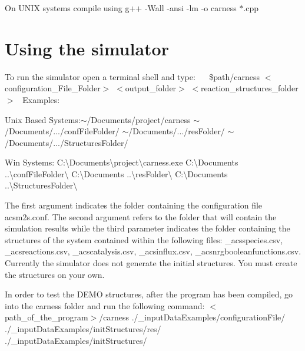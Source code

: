 On U\+N\+I\+X systems compile using {\ttfamily g++} -\/\+Wall -\/ansi -\/lm -\/o carness $\ast$.cpp ~\newline
~\newline
 \hypertarget{a00002_secUsage}{}\section{Using the simulator}\label{a00002_secUsage}
To run the simulator open a terminal shell and type\+:~\newline
~\newline
 {\ttfamily } \$path/carness {\ttfamily } $<$configuration\+\_\+\+File\+\_\+\+Folder$>$ {\ttfamily } $<$output\+\_\+folder$>$ {\ttfamily } $<$reaction\+\_\+structures\+\_\+folder$>$~\newline
 Examples\+:
\begin{DoxyItemize}
\item Unix Based Systems\+:{\ttfamily $\sim$/\+Documents/project/carness} {\ttfamily $\sim$/\+Documents/}.../conf\+File\+Folder/ {\ttfamily $\sim$/\+Documents/}.../res\+Folder/ {\ttfamily $\sim$/\+Documents/}.../\+Structures\+Folder/
\item Win Systems\+: {\ttfamily C\+:\textbackslash{}Documents\textbackslash{}project\textbackslash{}carness.\+exe} {\ttfamily C\+:\textbackslash{}Documents} ..\textbackslash{}conf\+File\+Folder\textbackslash{} {\ttfamily C\+:\textbackslash{}Documents} ..\textbackslash{}res\+Folder\textbackslash{} {\ttfamily C\+:\textbackslash{}Documents} ..\textbackslash{}Structures\+Folder\textbackslash{}
\end{DoxyItemize}

The first argument indicates the folder containing the configuration file acsm2s.\+conf. The second argument refers to the folder that will contain the simulation results while the third parameter indicates the folder containing the structures of the system contained within the following files\+: \+\_\+acsspecies.\+csv, \+\_\+acsreactions.\+csv, \+\_\+acscatalysis.\+csv, \+\_\+acsinflux.\+csv, \+\_\+acsnrgbooleanfunctions.\+csv. Currently the simulator does not generate the initial structures. You must create the structures on your own.

In order to test the D\+E\+M\+O structures, after the program has been compiled, go into the carness folder and run the following command\+: {\ttfamily } $<$path\+\_\+of\+\_\+the\+\_\+program$>$/carness {\ttfamily }./\+\_\+input\+Data\+Examples/configuration\+File/ {\ttfamily }./\+\_\+input\+Data\+Examples/init\+Structures/res/ {\ttfamily }./\+\_\+input\+Data\+Examples/init\+Structures/

